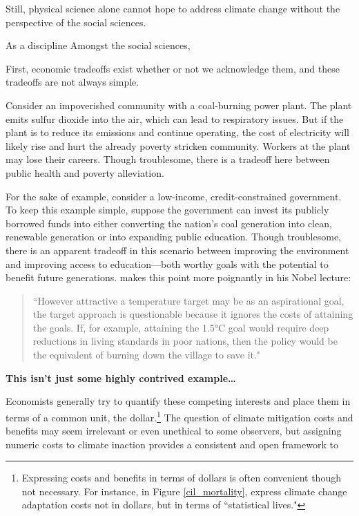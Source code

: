 Still, physical science alone cannot hope to address climate change without the perspective of the social sciences. 





As a discipline
Amongst the social sciences,


First, economic tradeoffs exist whether or not we acknowledge them, and these tradeoffs are not always simple. 

Consider an impoverished community with a coal-burning power plant. The plant emits sulfur dioxide into the air, which can lead to respiratory issues. But if the plant is to reduce its emissions and continue operating, the cost of electricity will likely rise and hurt the already poverty stricken community. Workers at the plant may lose their careers. Though troublesome, there is a tradeoff here between public health and poverty alleviation. 

For the sake of example, consider a low-income, credit-constrained government. To keep this example simple, suppose the government can invest its publicly borrowed funds into either converting the nation's coal generation into clean, renewable generation or into expanding public education. Though troublesome, there is an apparent tradeoff in this scenario between improving the environment and improving access to education---both worthy goals with the potential to benefit future generations. \cite{nordhaus2019climate} makes this point more poignantly in his Nobel lecture:
\begin{quote}
	``However attractive a temperature target may be as an aspirational goal, the target approach is questionable because it ignores the costs of attaining the goals. If, for example, attaining the 1.5°C goal would require deep reductions in living standards in poor nations, then the policy would be the equivalent of burning down the village to save it."
\end{quote}

\textbf{This isn't just some highly contrived example\ldots}

Economists generally try to quantify these competing interests and place them in terms of a common unit, the dollar.\footnote{Expressing costs and benefits in terms of dollars is often  convenient though not necessary. For instance, in Figure \ref{cil_mortality}, \cite{carleton2022valuing} express climate change adaptation costs not in dollars, but in terms of ``statistical lives."} The question of climate mitigation costs and benefits may seem irrelevant or even unethical to some observers, but assigning numeric costs to climate inaction provides a consistent and open framework to



